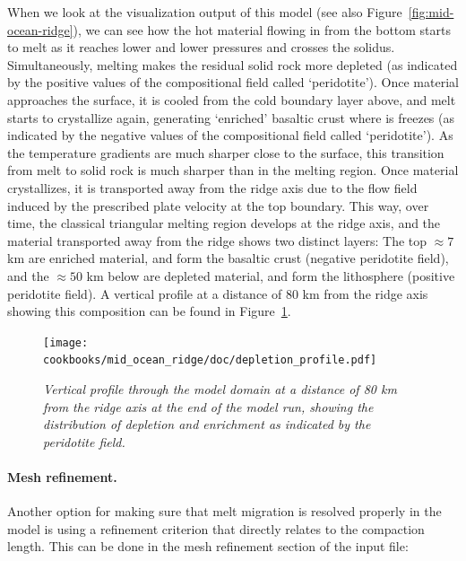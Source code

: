 \documentclass{article}
\begin{document}
When we look at the visualization output of this model (see also Figure~\ref{fig:mid-ocean-ridge}),
we can see how the hot material flowing in
from the bottom starts to melt as it reaches lower and lower pressures and crosses the solidus.  Simultaneously, melting makes the residual solid rock more depleted (as indicated by the positive
values of the compositional field called `peridotite'). Once material approaches the surface,
it is cooled from the cold boundary layer above, and melt starts to crystallize again, generating
`enriched' basaltic crust where is freezes (as indicated by the negative values of the compositional
field called `peridotite'). As the temperature gradients are much sharper close to the surface, this
transition from melt to solid rock is much sharper than in the melting region. Once material
crystallizes, it is transported away from the ridge axis due to the flow field induced by the prescribed
plate velocity at the top boundary. This way, over time, the classical triangular melting region develops
at the ridge axis, and the material transported away from the ridge shows two distinct layers:
The top $\approx 7$ km are enriched material, and form the basaltic crust (negative peridotite field),
and the $\approx 50$ km below are depleted material, and form the lithosphere (positive peridotite field).
A vertical profile at a distance of 80 km from the ridge axis showing this composition can be found in Figure~\ref{fig:mid-ocean-ridge-profile}.

\begin{figure}
    \centering
    \texttt{[image: cookbooks/mid\_ocean\_ridge/doc/depletion\_profile.pdf]}
    \caption{\it Vertical profile through the model domain at a distance of 80 km from the ridge axis
             at the end of the model run, showing the distribution of depletion and enrichment as
             indicated by the peridotite field.}
    \label{fig:mid-ocean-ridge-profile}
\end{figure}

\paragraph{Mesh refinement.}
Another option for making sure that melt migration is resolved properly in the model is using a
refinement criterion that directly relates to the compaction length. This can be done in the mesh
refinement section of the input file:


\end{document}
